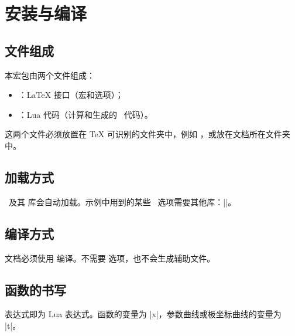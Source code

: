 \section{安装与编译}

\subsection{文件组成}

本宏包由两个文件组成：
\begin{itemize}
  \item {}：\LaTeX{} 接口（宏和选项）；
  \item {}：Lua 代码（计算和生成的 \TIKZ\ 代码）。
\end{itemize}

这两个文件必须放置在 \TeX{} 可识别的文件夹中，例如 ，或放在文档所在文件夹中。

\subsection{加载方式}

\begin{tkzltxexample}[]
\usepackage{tkz-fn}         %
\usepackage[us]{tkz-fn}     %
\usepackage[fr]{tkz-fn}     %
\end{tkzltxexample}

\TIKZ\ 及其  库会自动加载。示例中用到的某些 \TIKZ\ 选项需要其他库：|\usetikzlibrary{arrows,patterns}|。

\subsection{编译方式}

文档必须使用  编译。不需要  选项，也不会生成辅助文件。

\subsection{函数的书写}

表达式即为 Lua 表达式。函数的变量为 |x|，参数曲线或极坐标曲线的变量为 |t|。


